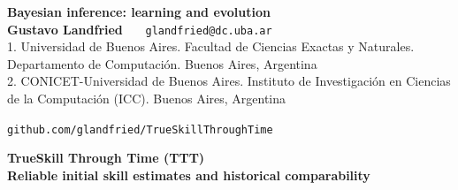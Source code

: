\documentclass[a0,portrait]{a0poster} %
\begin{document}
\centering \fontsize{90}{90} \textbf{Bayesian inference: learning and  evolution} \\[0.5cm]  %
\LARGE \textbf{Gustavo Landfried}  \ \ \  \texttt{glandfried@dc.uba.ar} \\
\large 1. Universidad de Buenos Aires. Facultad de Ciencias Exactas y Naturales. Departamento de Computaci\'on. Buenos Aires, Argentina \\ 
\large 2. CONICET-Universidad de Buenos Aires. Instituto de Investigaci\'on en Ciencias de la Computaci\'on (ICC). Buenos Aires, Argentina \\


\vspace{0cm}

\begin{multicols}{2}
\fontsize{40}{50}\selectfont






















\centering

\texttt{github.com/glandfried/TrueSkillThroughTime}

{\fontsize{60}{72}\selectfont \textbf{TrueSkill Through Time (TTT)} \\[0.2cm]
\LARGE \textbf{Reliable initial skill estimates and historical comparability} } \\[0.8cm]

\justify 



\end{multicols}
\end{document}
